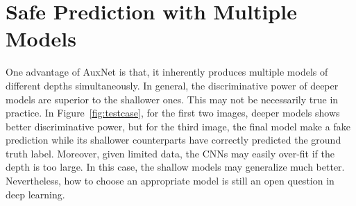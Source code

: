 \documentclass[10pt,onecolumn,letterpaper]{article}
\begin{document}
\begin{figure*}[t]
\centering

\hspace{-5ex}
\hspace{-3ex}
\hspace{-3ex}
\hspace{-3ex}

\caption{Prediction results AuxNet with 101 layers and 4 outputs on ImageNet validation data.  \textbf{Column (a)}: testing images with ground truth label; \textbf{Column (b)}: The top 5 prediction probabilities of the output at the $67$th layer; \textbf{Column (c)}: The top 5 prediction probabilities of the output at the $79$th layer; \textbf{Column (d)}: The top 5 prediction probabilities of the output at the $91$th layer; \textbf{Column (e)}: The top 5 prediction probabilities of the output at the $101$th layer. The red bar denotes the prediction probability of the ground truth class.}\label{fig:safeprediction}
\label{fig:testcase}
\end{figure*}

\section{Safe Prediction with Multiple  Models}\label{sec:safe}
One advantage of AuxNet is that, it inherently produces multiple models of different depths simultaneously.
In general, the discriminative power of deeper models are superior to the shallower ones.  This may not be necessarily true in practice. In Figure~\ref{fig:testcase}, for the first two images, deeper models shows better discriminative power, but for the third image, the final model make a fake prediction while its shallower counterparts have correctly predicted the ground truth label. Moreover, given limited data, the CNNs may easily over-fit if the depth is too large. In this case, the shallow models may generalize much better. Nevertheless, how to choose an appropriate model is still an open question in deep learning.
\end{document}
